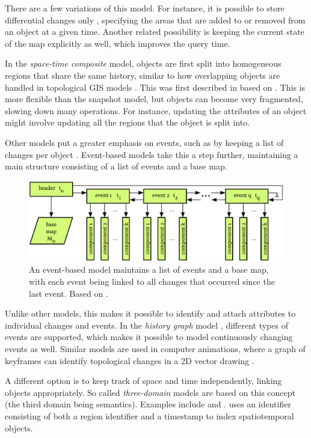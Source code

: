 There are a few variations of this model.
For instance, it is possible to store differential changes only \citep{Langran88}, specifying the areas that are added to or removed from an object at a given time.
Another related possibility is keeping the current state of the map explicitly as well, which improves the query time.

In the \emph{space-time composite} model, objects are first split into homogeneous regions that share the same history, similar to how overlapping objects are handled in topological GIS models \citep{Rossignac89}.
This was first described in \citet{Chrisman83} based on \citet{Peucker75}.
This is more flexible than the snapshot model, but objects can become very fragmented, slowing down many operations.
For instance, updating the attributes of an object might involve updating all the regions that the object is split into.

Other models put a greater emphasis on events, such as by keeping a list of changes per object \citep{Worboys92,Peuquet94}.
Event-based models \citep{Peuquet95} take this a step further, maintaining a main structure consisting of a list of events and a base map.
\begin{figure}[tbp]
\centering
\includegraphics[width=\linewidth]{figs/st_events}
\caption[An event-based model]{An event-based model maintains a list of events and a base map, with each event being linked to all changes that occurred since the last event. Based on \citet{Peuquet95}.}
\label{fig:st_events}
\end{figure}
Unlike other models, this makes it possible to identify and attach attributes to individual changes and events.
In the \emph{history graph} model \citep{Renolen96}, different types of events are supported, which makes it possible to model continuously changing events as well.
Similar models are used in computer animations, where a graph of keyframes can identify topological changes in a 2D vector drawing \citep{Dalstein15}.

A different option is to keep track of space and time independently, linking objects appropriately.
So called \emph{three-domain} models are based on this concept (the third domain being semantics).
Examples include \citet{Yuan94} and \citet{Claramunt95}.
\citet{vanOosterom97} uses an identifier consisting of both a region identifier and a timestamp to index spatiotemporal objects.

